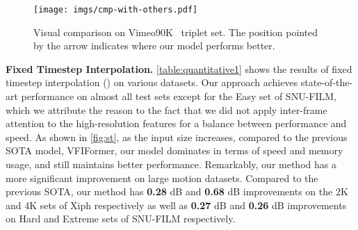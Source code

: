 \documentclass[10pt,twocolumn,letterpaper]{article}
\begin{document}
    \begin{figure*}[t]
		\begin{center}
			\texttt{[image: imgs/cmp-with-others.pdf]}
		\end{center}
		\vspace{-0.20in}
		\caption{Visual comparison on Vimeo90K~\cite{xue2019video} triplet set. The position pointed by the arrow indicates where our model performs better.}
		\label{fig:exp1}
		\vspace{-0.15in}   
     \end{figure*}

    \noindent
    \textbf{Fixed Timestep Interpolation.} \cref{table:quantitative1} shows the results of fixed timestep interpolation () on various datasets. Our approach achieves state-of-the-art performance on almost all test sets except for the Easy set of SNU-FILM, which we attribute the reason to the fact that we did not apply inter-frame attention to the high-resolution features for a balance between performance and speed. As shown in \cref{fig:st}, as the input size increases, compared to the previous SOTA model, VFIFormer, our model dominates in terms of speed and memory usage, and still maintains better performance. Remarkably, our method has a more significant improvement on large motion datasets. Compared to the previous SOTA, our method has \textbf{0.28} dB and \textbf{0.68} dB improvements on the 2K and 4K sets of Xiph respectively as well as \textbf{0.27} dB and \textbf{0.26} dB improvements on Hard and Extreme sets of SNU-FILM respectively.
    
\end{document}

